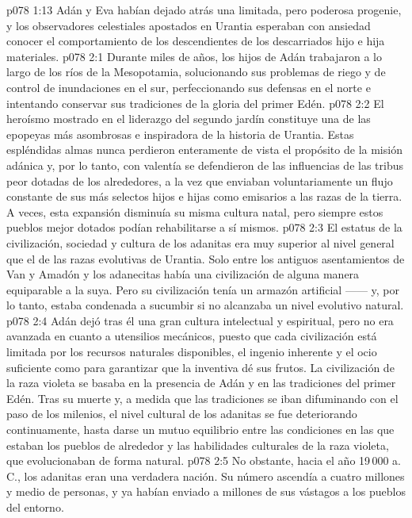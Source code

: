 \vs p078 1:13 Adán y Eva habían dejado atrás una limitada, pero poderosa progenie, y los observadores celestiales apostados en Urantia esperaban con ansiedad conocer el comportamiento de los descendientes de los descarriados hijo e hija materiales.
\vs p078 2:1 Durante miles de años, los hijos de Adán trabajaron a lo largo de los ríos de la Mesopotamia, solucionando sus problemas de riego y de control de inundaciones en el sur, perfeccionando sus defensas en el norte e intentando conservar sus tradiciones de la gloria del primer Edén.
\vs p078 2:2 El heroísmo mostrado en el liderazgo del segundo jardín constituye una de las epopeyas más asombrosas e inspiradora de la historia de Urantia. Estas espléndidas almas nunca perdieron enteramente de vista el propósito de la misión adánica y, por lo tanto, con valentía se defendieron de las influencias de las tribus peor dotadas de los alrededores, a la vez que enviaban voluntariamente un flujo constante de sus más selectos hijos e hijas como emisarios a las razas de la tierra. A veces, esta expansión disminuía su misma cultura natal, pero siempre estos pueblos mejor dotados podían rehabilitarse a sí mismos.
\vs p078 2:3 El estatus de la civilización, sociedad y cultura de los adanitas era muy superior al nivel general que el de las razas evolutivas de Urantia. Solo entre los antiguos asentamientos de Van y Amadón y los adanecitas había una civilización de alguna manera equiparable a la suya. Pero su civilización tenía un armazón artificial ------ y, por lo tanto, estaba condenada a sucumbir si no alcanzaba un nivel evolutivo natural.
\vs p078 2:4 Adán dejó tras él una gran cultura intelectual y espiritual, pero no era avanzada en cuanto a utensilios mecánicos, puesto que cada civilización está limitada por los recursos naturales disponibles, el ingenio inherente y el ocio suficiente como para garantizar que la inventiva dé sus frutos. La civilización de la raza violeta se basaba en la presencia de Adán y en las tradiciones del primer Edén. Tras su muerte y, a medida que las tradiciones se iban difuminando con el paso de los milenios, el nivel cultural de los adanitas se fue deteriorando continuamente, hasta darse un mutuo equilibrio entre las condiciones en las que estaban los pueblos de alrededor y las habilidades culturales de la raza violeta, que evolucionaban de forma natural.
\vs p078 2:5 No obstante, hacia el año 19\,000 a. C., los adanitas eran una verdadera nación. Su número ascendía a cuatro millones y medio de personas, y ya habían enviado a millones de sus vástagos a los pueblos del entorno.
